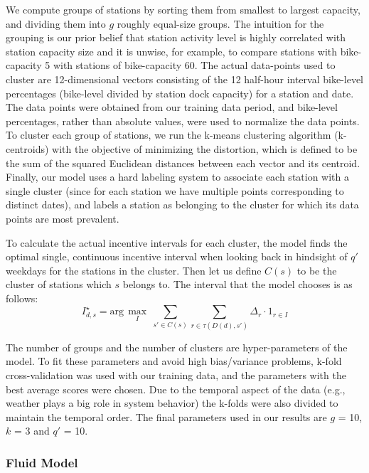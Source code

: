 We compute groups of stations by sorting them from smallest to largest capacity, and dividing them into $g$ roughly equal-size groups. %
The intuition for the grouping is our prior belief that station activity level is highly correlated with station capacity size and it is unwise, for example, to compare stations with bike-capacity 5 with stations of bike-capacity 60. The actual data-points used to cluster are 12-dimensional vectors consisting of the 12 half-hour interval bike-level percentages (bike-level divided by station dock capacity) for a station and date. The data points were obtained from our training data period, and bike-level percentages, rather than absolute values, were used to normalize the data points. To cluster each group of stations, we run the k-means clustering algorithm (k-centroids) with the objective of minimizing the distortion, which is defined to be the sum of the squared Euclidean distances between each vector and its centroid. Finally, our model uses a hard labeling system to associate each station with a single cluster (since for each station we have multiple points corresponding to distinct dates), and labels a station as belonging to the cluster for which its data points are most prevalent. 

To calculate the actual incentive intervals for each cluster, the model finds the optimal single, continuous incentive interval when looking back in hindsight of $q'$ weekdays for the stations in the cluster. Then let us define $C(s)$ to be the cluster of stations which $s$ belongs to. The interval that the model chooses is as follows:
\begin{equation}
I_{d,s}^\star= \text{arg}\,\max\limits_{I}\ \sum_{s' \in C(s)} \sum_{r \in \tau(D(d), s')} \Delta_{r} \cdot 1_{r \in I}
\end{equation}

The number of groups and the number of clusters are hyper-parameters of the model. To fit these parameters and avoid high bias/variance problems, k-fold cross-validation was used with our training data, and the parameters with the best average scores were chosen. Due to the temporal aspect of the data (e.g., weather plays a big role in system behavior) the k-folds were also divided to maintain the temporal order. The final parameters used in our results are $g$ = 10, $k$ = 3 and $q'$ = 10.

\subsubsection{Fluid Model}


